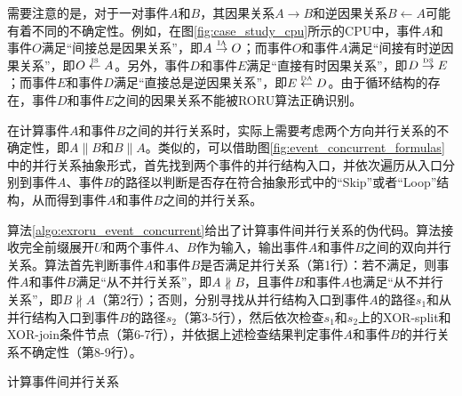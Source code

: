 
需要注意的是，对于一对事件$A$和$B$，其因果关系$A\rightarrow B$和逆因果关系$B\leftarrow A$可能有着不同的不确定性。例如，在图\ref{fig:case_study_cpu}所示的CPU中，事件$A$和事件$O$满足“间接总是因果关系”，即$A\overset{\text{\tiny{IA}}}{\rightarrow}O$；而事件$O$和事件$A$满足“间接有时逆因果关系”，即$O\overset{\text{\tiny{IS}}}{\leftarrow}A$。另外，事件$D$和事件$E$满足“直接有时因果关系”，即$D\overset{\text{\tiny{DS}}}{\rightarrow}E$；而事件$E$和事件$D$满足“直接总是逆因果关系”，即$E\overset{\text{\tiny{DA}}}{\leftarrow}D$。由于循环结构的存在，事件$D$和事件$E$之间的因果关系不能被RORU算法正确识别。

在计算事件$A$和事件$B$之间的并行关系时，实际上需要考虑两个方向并行关系的不确定性，即$A\parallel B$和$B\parallel A$。类似的，可以借助图\ref{fig:event_concurrent_formulas}中的并行关系抽象形式，首先找到两个事件的并行结构入口，并依次遍历从入口分别到事件$A$、事件$B$的路径以判断是否存在符合抽象形式中的“Skip”或者“Loop”结构，从而得到事件$A$和事件$B$之间的并行关系。

算法\ref{algo:exroru_event_concurrent}给出了计算事件间并行关系的伪代码。算法接收完全前缀展开$U$和两个事件$A$、$B$作为输入，输出事件$A$和事件$B$之间的双向并行关系。算法首先判断事件$A$和事件$B$是否满足并行关系（第1行）：若不满足，则事件$A$和事件$B$满足“从不并行关系”，即$A\nparallel B$，且事件$B$和事件$A$也满足“从不并行关系”，即$B\nparallel A$（第2行）；否则，分别寻找从并行结构入口到事件$A$的路径$s_{1}$和从并行结构入口到事件$B$的路径$s_{2}$（第3-5行），然后依次检查$s_{1}$和$s_{2}$上的XOR-split和XOR-join条件节点（第6-7行），并依据上述检查结果判定事件$A$和事件$B$的并行关系不确定性（第8-9行）。

\begin{algorithm}[htbp]
  \LinesNumbered
  \caption{计算事件间并行关系}
  \label{algo:exroru_event_concurrent}
   {
  } 
\end{algorithm}

